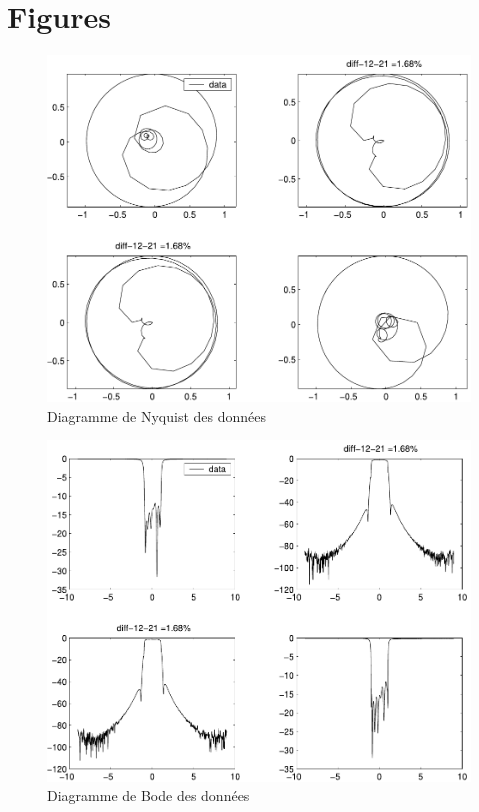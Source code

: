 \documentclass[12]{article}
\begin{document}
\vspace{1cm}



\vspace{1cm}


  
\section{Figures}  
\newpage  
\begin{figure}
\begin{center}
\includegraphics[width=0.8\linewidth]{Spbbrut.pdf}
\end{center}
\caption{Diagramme de Nyquist des donn\'ees}
\label{nyqSpb}
\end{figure}
\begin{figure}
\begin{center}
\includegraphics[width=0.8\linewidth]{Spbbode.pdf}  
\end{center}
\caption{Diagramme de Bode des donn\'ees}
\label{bodeSpb}
\end{figure}
\end{document}
